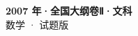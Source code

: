 \documentclass[zihao=-4, a4paper]{ctexart}
\begin{document}
\begin{center}
  {\Large\bfseries 2007 年·全国大纲卷Ⅱ·文科}\\[4pt]
  {\large 数学 · 试题版}
\end{center}
\medskip
{}

\end{document}
